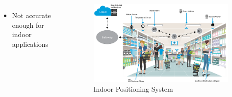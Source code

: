 \documentclass[10pt]{beamer}
\begin{document}
\begin{frame}
\begin{columns}
\begin{itemize}
    \item Not accurate enough for indoor applications
\end{itemize}
\begin{figure}[h]
    \begin{center}
        \includegraphics[width=1\textwidth]{ips.png}
    \end{center}
    \caption{Indoor Positioning System}
    \label{fig:ips}
\end{figure}
\end{columns}
\end{frame}
\end{document}
